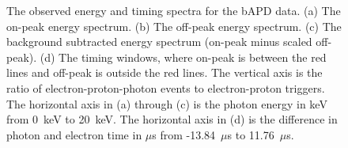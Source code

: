 \documentclass[oneside,12pt]{memoir}
\begin{document}
\begin{figure}[t]
	\centering
	\par
	\caption[bAPD observed energy and timing spectra.]
		{The observed energy and timing spectra for the bAPD data. (a) The on-peak energy spectrum. (b) The off-peak energy spectrum. (c) The background subtracted energy spectrum (on-peak minus scaled off-peak). (d) The timing windows, where on-peak is between the red lines and off-peak is outside the red lines. The vertical axis is the ratio of electron-proton-photon events to electron-proton triggers. The horizontal axis in (a) through (c) is the photon energy in keV from 0~keV to 20~keV. The horizontal axis in (d) is the difference in photon and electron time in $\mu$s from -13.84~$\mu$s to 11.76~$\mu$s.}
	\label{fig:bapd_results}
\end{figure}
\end{document}
